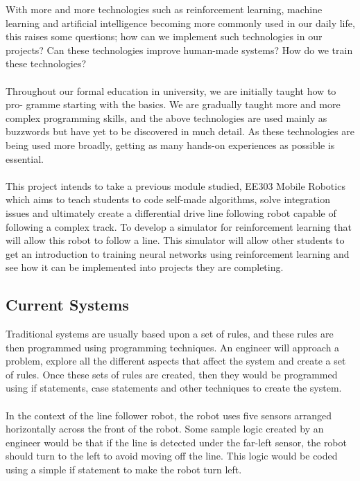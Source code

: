 \documentclass[12pt]{article}
\begin{document}
With more and more technologies such as reinforcement learning, machine learning and artificial intelligence becoming more commonly used in our daily life, this raises some questions; how can we implement such technologies in our projects? Can these technologies improve human-made systems? How do we train these technologies?
\\\\
Throughout our formal education in university, we are initially taught how to pro- gramme starting with the basics. We are gradually taught more and more complex programming skills, and the above technologies are used mainly as buzzwords but have yet to be discovered in much detail. As these technologies are being used more broadly, getting as many hands-on experiences as possible is essential.
\\\\
This project intends to take a previous module studied, EE303 Mobile Robotics which aims to teach students to code self-made algorithms, solve integration issues and ultimately create a differential drive line following robot capable of following a complex track. To develop a simulator for reinforcement learning that will allow this robot to follow a line. This simulator will allow other students to get an introduction to training neural networks using reinforcement learning and see how it can be implemented into projects they are completing.

\subsection{Current Systems}

Traditional systems are usually based upon a set of rules, and these rules are then programmed using programming techniques. An engineer will approach a problem, explore all the different aspects that affect the system and create a set of rules. Once these sets of rules are created, then they would be programmed using if statements, case statements and other techniques to create the system.
\\\\
In the context of the line follower robot, the robot uses five sensors arranged horizontally across the front of the robot. Some sample logic created by an engineer would be that if the line is detected under the far-left sensor, the robot should turn to the left to avoid moving off the line. This logic would be coded using a simple if statement to make the robot turn left.
\end{document}
